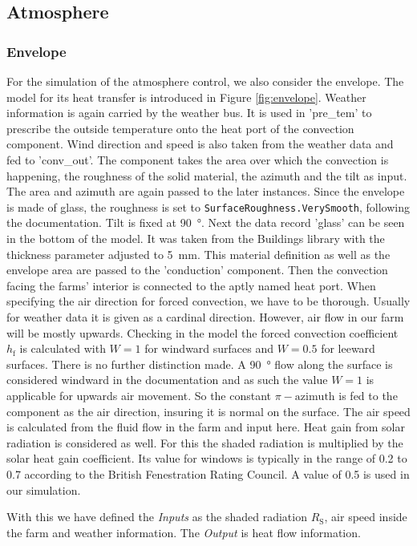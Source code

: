 \subsection{Atmosphere}
\subsubsection{Envelope}
For the simulation of the atmosphere control, we also consider the envelope.
The model for its heat transfer is introduced in Figure \ref{fig:envelope}.
Weather information is again carried by the weather bus.
It is used in 'pre\_tem' to prescribe the outside temperature onto the heat port of the convection component.
Wind direction and speed is also taken from the weather data and fed to 'conv\_out'.
The component takes the area over which the convection is happening, the roughness of the solid material, the azimuth and the tilt as input.
The area and azimuth are again passed to the later instances.
Since the envelope is made of glass, the roughness is set to \lstinline{SurfaceRoughness.VerySmooth}, following the documentation.
Tilt is fixed at \SI{90}{\degree}.
Next the data record 'glass' can be seen in the bottom of the model.
It was taken from the Buildings library with the thickness parameter adjusted to \SI{5}{\mm}.
This material definition as well as the envelope area are passed to the 'conduction' component.
Then the convection facing the farms' interior is connected to the aptly named heat port.
When specifying the air direction for forced convection, we have to be thorough.
Usually for weather data it is given as a cardinal direction.
However, air flow in our farm will be mostly upwards.
Checking in the model the forced convection coefficient $h_\text{f}$ is calculated with $W=1$ for windward surfaces and $W=0.5$ for leeward surfaces.
There is no further distinction made.
A \SI{90}{\degree} flow along the surface is considered windward in the documentation and as such the value $W=1$ is applicable for upwards air movement.
So the constant $\pi - \text{azimuth}$ is fed to the component as the air direction, insuring it is normal on the surface.
The air speed is calculated from the fluid flow in the farm and input here.
Heat gain from solar radiation is considered as well.
For this the shaded radiation is multiplied by the solar heat gain coefficient.
Its value for windows is typically in the range of 0.2 to 0.7 according to the British Fenestration Rating Council.
A value of 0.5 is used in our simulation.

With this we have defined the \textit{Inputs} as the shaded radiation $R_\text{S}$, air speed inside the farm and weather information.
The \textit{Output} is heat flow information.

